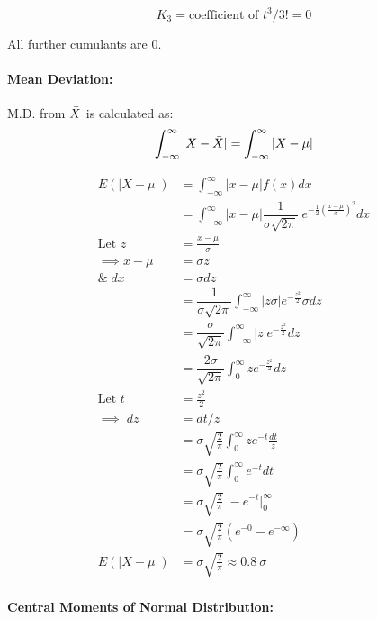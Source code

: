 \documentclass[
10pt, %
a4paper, %
]{report}
\begin{document}
\[
K_3 = \text{coefficient of } t^3/3! = 0
\]

All further cumulants are \(0\).

\paragraph*{Mean Deviation:}
M.D. from \(\Bar{X}\) is calculated as:
\[
\int_{-\infty}^{\infty} |X-\Bar{X}| = \int_{-\infty}^{\infty} |X-\mu|
\]

\begin{align*}
    E(|X-\mu|) &= \int_{-\infty}^{\infty} |x-\mu| f(x) dx \\
               &= \int_{-\infty}^{\infty} |x-\mu| \dfrac{1}{\sigma\sqrt{2\pi}} \; e^{-\frac{1}{2}( \frac{x-\mu}{\sigma})^2} dx \\
               \text{Let } z &= \frac{x-\mu}{\sigma} \\ \implies x-\mu &= \sigma z \\ \& \; dx &= \sigma dz \\
               &= \dfrac{1}{\sigma\sqrt{2\pi}} \int_{-\infty}^\infty |z\sigma| e^{- \frac{z^2}{2}} \sigma dz\\
               &= \dfrac{\sigma}{\sqrt{2\pi}} \int_{-\infty}^\infty |z| e^{- \frac{z^2}{2}} dz\\
               &= \dfrac{2\sigma}{\sqrt{2\pi}} \int_0^\infty z e^{- \frac{z^2}{2}} dz\\
               \text{Let } t &= \frac{z^2}{2} \\ \implies \; dz &= dt/z \\
               &= \sigma \sqrt{\frac{2}{\pi}} \int_0^\infty z e^{-t} \frac{dt}{z} \\
               &= \sigma \sqrt{\frac{2}{\pi}} \int_0^\infty e^{-t} dt \\
               &= \sigma \sqrt{\frac{2}{\pi}} \; -e^{-t} \Big|_0^\infty \\
               &= \sigma \sqrt{\frac{2}{\pi}} (e^{-0} - e^{-\infty}) \\
    E(|X-\mu|) &= \sigma \sqrt{\frac{2}{\pi}} \approx 0.8 \: \sigma
\end{align*}

\paragraph*{Central Moments of Normal Distribution:}
\end{document}
